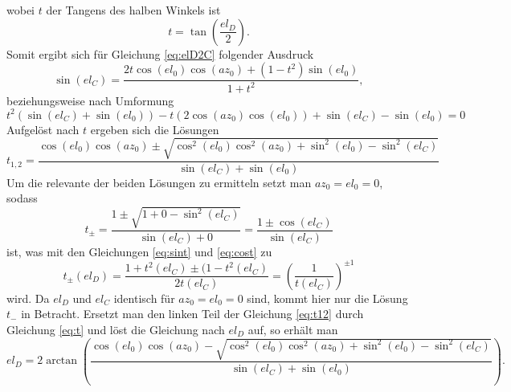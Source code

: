 wobei $t$ der Tangens des halben Winkels ist
\begin{equation}
t=\tan\left(\frac{el_D}{2}\right).
\label{eq:t}
\end{equation}
Somit ergibt sich für Gleichung \ref{eq:elD2C} folgender Ausdruck
\begin{equation}
\sin\left(el_C\right)=\frac{2t\cos\left(el_0\right)\cos\left(az_0\right)+\left(1-t^2\right)\sin\left(el_0 \right)}{1+t^2},
\end{equation}
beziehungsweise nach Umformung
\begin{equation}
t^2\left(\sin(el_C)+\sin(el_0)\right)-t\left(2\cos(az_0)\cos(el_0)\right)+\sin(el_C)-\sin(el_0)=0
\end{equation}
Aufgelöst nach $t$ ergeben sich die Lösungen
\begin{equation}
t_{1,2}=\frac{\cos\left(el_0\right)\cos\left(az_0\right)\pm\sqrt{\cos^2\left(el_0\right)\cos^2\left(az_0\right)+\sin^2\left(el_0\right)-\sin^2\left(el_C\right)}}{\sin\left(el_C\right)+\sin\left(el_0\right)}
\label{eq:t12}
\end{equation}
Um die relevante der beiden Lösungen zu ermitteln setzt man $az_0=el_0=0$, sodass
\begin{equation}
t_{\pm}=\frac{1\pm\sqrt{1+0-\sin^2\left(el_C\right)}}{\sin\left(el_C\right)+0}=\frac{1\pm\cos\left(el_C\right)}{\sin\left(el_C\right)}
\end{equation}
ist, was mit den Gleichungen \ref{eq:sint} und \ref{eq:cost} zu 
\begin{equation}
t_{\pm}(el_D)=\frac{1+t^2(el_C)\pm(1-t^2(el_C)}{2t(el_C)}=\left(\frac{1}{t(el_C)}\right)^{\pm1}
\end{equation}
wird. Da $el_D$ und $el_C$ identisch für $az_0=el_0=0$ sind, kommt hier nur die Lösung $t_-$ in Betracht. Ersetzt man den linken Teil der Gleichung \ref{eq:t12} durch Gleichung \ref{eq:t} und löst die Gleichung nach $el_D$ auf, so erhält man
\begin{equation}
el_D=2\arctan\left(\frac{\cos(el_0)\cos(az_0)-\sqrt{\cos^2(el_0)\cos^2(az_0)+\sin^2(el_0)-\sin^2(el_C)}}{\sin(el_C)+\sin(el_0)}\right).
\label{eq:elC2D}
\end{equation}
